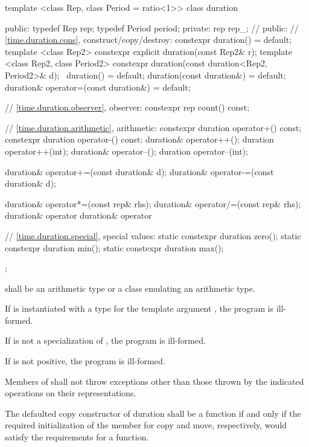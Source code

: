 \begin{codeblock}
template <class Rep, class Period = ratio<1>>
class duration {
public:
  typedef Rep    rep;
  typedef Period period;
private:
  rep rep_;  // \expos
public:
  // \ref{time.duration.cons}, construct/copy/destroy:
  constexpr duration() = default;
  template <class Rep2>
      constexpr explicit duration(const Rep2& r);
  template <class Rep2, class Period2>
     constexpr duration(const duration<Rep2, Period2>& d);
  ~duration() = default;
  duration(const duration&) = default;
  duration& operator=(const duration&) = default;

  // \ref{time.duration.observer}, observer:
  constexpr rep count() const;

  // \ref{time.duration.arithmetic}, arithmetic:
  constexpr duration  operator+() const;
  constexpr duration  operator-() const;
  duration& operator++();
  duration  operator++(int);
  duration& operator--();
  duration  operator--(int);

  duration& operator+=(const duration& d);
  duration& operator-=(const duration& d);

  duration& operator*=(const rep& rhs);
  duration& operator/=(const rep& rhs);
  duration& operator%
  duration& operator%

  // \ref{time.duration.special}, special values:
  static constexpr duration zero();
  static constexpr duration min();
  static constexpr duration max();
};
\end{codeblock}

\begin{itemdescr}
\pnum
\requires {} shall be an arithmetic type or a class emulating an arithmetic type.

\pnum
\remarks If  is instantiated with a  type for the template
argument , the program is ill-formed.

\pnum
\remarks If  is not a specialization of , the program is ill-formed.

\pnum
\remarks If  is not positive, the program is ill-formed.

\pnum
\requires Members of  shall not throw exceptions other than
those thrown by the indicated operations on their representations.

\pnum
\remarks The defaulted copy constructor of duration shall be a
 function if and only if the required initialization
of the member  for copy and move, respectively, would
satisfy the requirements for a  function.
\end{itemdescr}

